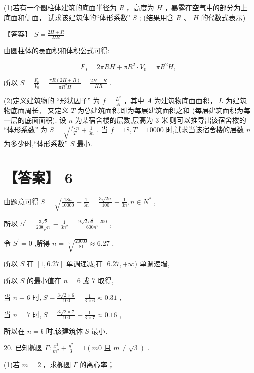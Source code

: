 \documentclass[10pt]{article}
\begin{document}
(1)若有一个圆柱体建筑的底面半径为 \(R\) ，高度为 \(H\) ，暴露在空气中的部分为上底面和侧面， 试求该建筑体的“体形系数” \(S\) ; (结果用含 \(R\) 、 \(H\) 的代数式表示)

【答案】 \(S = \frac{{2H} + R}{HR}\)

由圆柱体的表面积和体积公式可得:

\[
{F}_{0} = {2\pi RH} + \pi {R}^{2} \cdot  {V}_{0} = \pi {R}^{2}H,
\]

所以 \(S = \frac{{F}_{0}}{{V}_{0}} = \frac{{\pi R}\left( {{2H} + R}\right) }{\pi {R}^{2}H} = \frac{{2H} + R}{HR}\) .

(2)定义建筑物的 “形状因子” 为 \(f = \frac{{L}^{2}}{A}\) ，其中 \(A\) 为建筑物底面面积， \(L\) 为建筑物底面周长， 又定义 \(T\) 为总建筑面积,即为每层建筑面积之和 (每层建筑面积为每一层的底面面积). 设 \(n\) 为某宿舍楼的层数,层高为 3 米,则可以推导出该宿舍楼的 “体形系数” 为 \(S = \sqrt{\frac{f \cdot  n}{T}} + \frac{1}{3n}\) . 当 \(f = {18},T = {10000}\) 时,试求当该宿舍楼的层数 \(n\) 为多少时,“体形系数” \(S\) 最小.

\section*{【答案】 6}

由题意可得 \(S = \sqrt{\frac{18n}{10000}} + \frac{1}{3n} = \frac{3\sqrt{2n}}{100} + \frac{1}{3n},n \in  {N}^{ * }\) ,

所以 \({S}^{\prime } = \frac{3\sqrt{2}}{{200}\sqrt{n}} - \frac{1}{3{n}^{2}} = \frac{9\sqrt{2}{n}^{\frac{3}{2}} - {200}}{{600}{n}^{2}}\) ,

令 \({S}^{\prime } = 0\) ,解得 \(n = \sqrt[3]{\frac{20000}{81}} \approx  {6.27}\) ,

所以 \(S\) 在 \(\left\lbrack  {1,{6.27}}\right\rbrack\) 单调递减,在 \(\lbrack {6.27}, + \infty )\) 单调递增,

所以 \(S\) 的最小值在 \(n = 6\) 或 7 取得,

当 \(n = 6\) 时, \(S = \frac{3\sqrt{2 \times  6}}{100} + \frac{1}{3 \times  6} \approx  {0.31}\) ,

当 \(n = 7\) 时, \(S = \frac{3\sqrt{2 \times  7}}{100} + \frac{1}{3 \times  7} \approx  {0.16}\) ,

所以在 \(n = 6\) 时,该建筑体 \(S\) 最小.

20. 已知椭圆 \(\Gamma  : \frac{{x}^{2}}{{m}^{2}} + \frac{{y}^{2}}{3} = 1\left( {{m0}\text{ 且 }m \neq  \sqrt{3}}\right)\) .

(1)若 \(m = 2\) ，求椭圆 \(\Gamma\) 的离心率；
\end{document}
